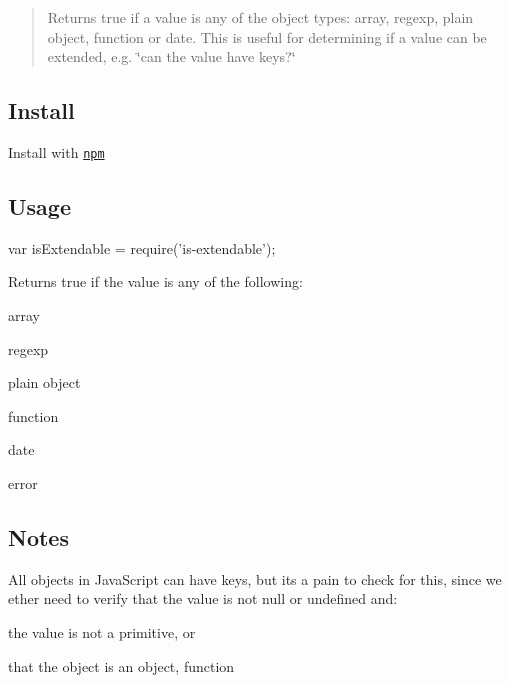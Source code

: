 \begin{quote}
Returns true if a value is any of the object types\+: array, regexp, plain object, function or date. This is useful for determining if a value can be extended, e.\+g. \char`\"{}can the value have keys?\char`\"{} \end{quote}


\subsection*{Install}

Install with \href{https://www.npmjs.com/}{\tt npm}




\subsection*{Usage}


\begin{DoxyCode}
var isExtendable = require('is-extendable');
\end{DoxyCode}


Returns true if the value is any of the following\+:


\begin{DoxyItemize}
\item {\ttfamily array}
\item {\ttfamily regexp}
\item {\ttfamily plain object}
\item {\ttfamily function}
\item {\ttfamily date}
\item {\ttfamily error}
\end{DoxyItemize}

\subsection*{Notes}

All objects in Java\+Script can have keys, but it\textquotesingle{}s a pain to check for this, since we ether need to verify that the value is not {\ttfamily null} or {\ttfamily undefined} and\+:


\begin{DoxyItemize}
\item the value is not a primitive, or
\item that the object is an {\ttfamily object}, {\ttfamily function}
\end{DoxyItemize}

